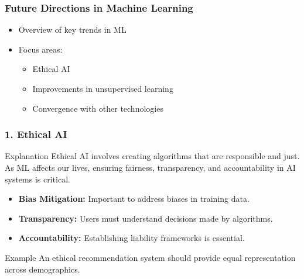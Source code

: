 \documentclass{beamer}
\begin{document}
\begin{frame}[fragile]
    \frametitle{Future Directions in Machine Learning}
    \begin{itemize}
        \item Overview of key trends in ML
        \item Focus areas:
        \begin{itemize}
            \item Ethical AI
            \item Improvements in unsupervised learning
            \item Convergence with other technologies
        \end{itemize}
    \end{itemize}
\end{frame}

\begin{frame}[fragile]
    \frametitle{1. Ethical AI}
    \begin{block}{Explanation}
        Ethical AI involves creating algorithms that are responsible and just. As ML affects our lives, ensuring fairness, transparency, and accountability in AI systems is critical.
    \end{block}
    \begin{itemize}
        \item \textbf{Bias Mitigation:} Important to address biases in training data.
        \item \textbf{Transparency:} Users must understand decisions made by algorithms.
        \item \textbf{Accountability:} Establishing liability frameworks is essential.
    \end{itemize}
    \begin{block}{Example}
        An ethical recommendation system should provide equal representation across demographics.
    \end{block}
\end{frame}
\end{document}
